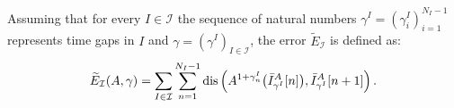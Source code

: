 Assuming that for every $I\in\mathcal{I}$ the sequence of natural numbers $\gamma^I = (\gamma^I_i)_{i=1}^{N_I-1}$ represents time gaps in $I$ and $\gamma = (\gamma^I)_{I\in\mathcal{I}}$, the error $\widetilde{E}_{\mathcal{I}}$ is defined as:
\begin{equation}
	\widetilde{E}_\mathcal{I}(A, \gamma) = \sum_{I\in\mathcal{I}} \sum_{n=1}^{N_I-1} \operatorname*{dis}\Big(A^{1+\gamma^I_n}\big(\bar{I}^A_{\gamma^I}[n]\big), \bar{I}^A_{\gamma^I}[n+1]\Big)\,.
\end{equation}





